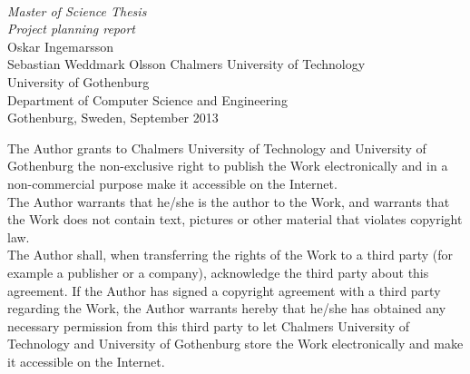 \begin{titlepage}

  \mbox{}
  \vfill
  \addtolength{\voffset}{2cm}
  \begin{flushleft}
    { \\
      \emph{\Large Master of Science Thesis} \\
      \emph{\Large Project planning report}\\[.8cm]
      
      {\huge Oskar Ingemarsson}\\
      {\huge Sebastian Weddmark Olsson}
      \vfill
	  {\normalsize Chalmers University of Technology \\
            University of Gothenburg \\
	    Department of Computer Science and Engineering \\
	    Gothenburg, Sweden, September 2013 \\
	  } 
    }
  \end{flushleft}

\end{titlepage}
\ClearShipoutPicture

\vspace*{2.5cm}
The Author grants to Chalmers University of Technology and University of Gothenburg  the non-exclusive right to publish the Work electronically and in a non-commercial purpose make it accessible on the Internet.\\
The Author warrants that he/she is the author to the Work, and warrants that the Work does not contain text, pictures or other material that violates copyright law. \\

The Author shall, when transferring the rights of the Work to a third party (for example a publisher or a company), acknowledge the third party about this agreement. If the Author has signed a copyright agreement with a third party regarding the Work, the Author warrants hereby that he/she has obtained any necessary permission from this third party to let Chalmers University of Technology and University of Gothenburg  store the Work electronically and make it accessible on the Internet.\\[0.6cm]

